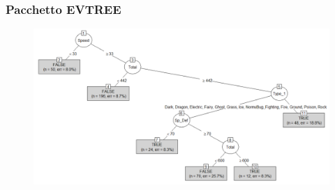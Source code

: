 	\begin{frame}
		\frametitle{Pacchetto EVTREE}
		\begin{center}
			\begin{figure}
				
			\end{figure}
			\begin{figure}
				\includegraphics[scale=0.3]{img/evTree}
			\end{figure}
		\end{center}
	\end{frame}

